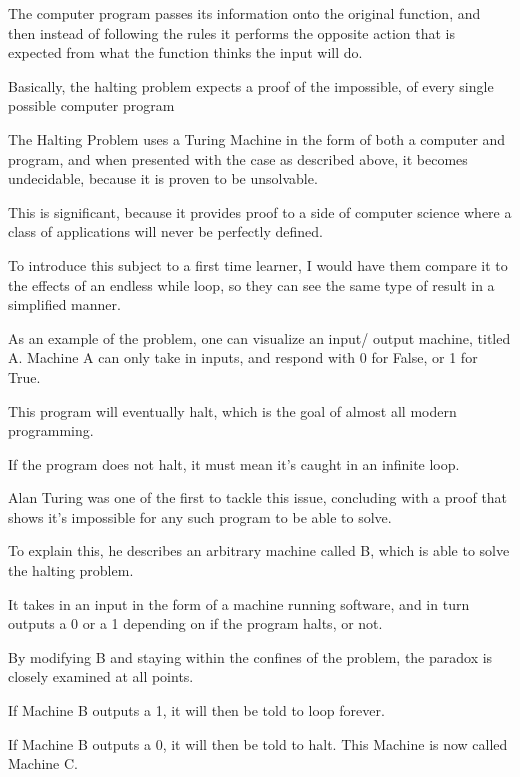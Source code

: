 \documentclass{article}
\begin{document}
\medskip\noindent
The computer program passes its information onto the original function, and then instead of following the rules it performs the opposite action that is expected from what the function thinks the input will do. 

\medskip\noindent
Basically, the halting problem expects a proof of the impossible, of every single possible computer program

\medskip\noindent
The Halting Problem uses a Turing Machine in the form of both a computer and program, and when presented with the case as described above, it becomes undecidable, because it is proven to be unsolvable. 

\medskip\noindent
This is significant, because it provides proof to a side of computer science where a class of applications will never be perfectly defined. 

\medskip\noindent
To introduce this subject to a first time learner, I would have them compare it to the effects of an endless while loop, so they can see the same type of result in a simplified manner. 

\medskip\noindent
As an example of the problem, one can visualize an input/ output machine, titled A. Machine A can only take in inputs, and respond with 0 for False, or 1 for True.

\medskip\noindent
This program will eventually halt, which is the goal of almost all modern programming. 

\medskip\noindent
If the program does not halt, it must mean it's caught in an infinite loop.

\medskip\noindent
Alan Turing was one of the first to tackle this issue, concluding with a proof that shows it's impossible for any such program to be able to solve.

\medskip\noindent
To explain this, he describes an arbitrary machine called B, which is able to solve the halting problem. 

\medskip\noindent
It takes in an input in the form of a machine running software, and in turn outputs a 0 or a 1 depending on if the program halts, or not.

\medskip\noindent
By modifying B and staying within the confines of the problem, the paradox is closely examined at all points. 

\medskip\noindent
If Machine B outputs a 1, it will then be told to loop forever. 

\medskip\noindent
If Machine B outputs a 0, it will then be told to halt. This Machine is now called Machine C.
\end{document}
